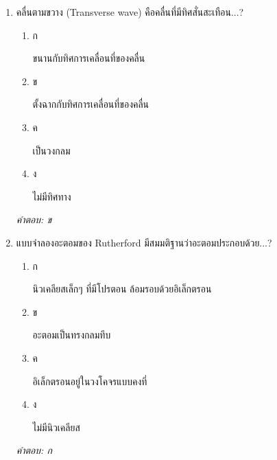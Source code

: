 \documentclass[12pt]{article}
\begin{document}
\begin{enumerate}[label=\arabic*., itemsep=0.5\baselineskip, topsep=0.5\baselineskip, leftmargin=*]
\item คลื่นตามขวาง (Transverse wave) คือคลื่นที่มีทิศสั่นสะเทือน...?
\begin{enumerate}[label=\alph*)., itemsep=0.3\baselineskip, topsep=0.3\baselineskip]
\item ก\ 
\begin{minipage}[t]{0.9\linewidth}
\raggedright ขนานกับทิศการเคลื่อนที่ของคลื่น
\end{minipage}
\item ข\ 
\begin{minipage}[t]{0.9\linewidth}
\raggedright ตั้งฉากกับทิศการเคลื่อนที่ของคลื่น
\end{minipage}
\item ค\ 
\begin{minipage}[t]{0.9\linewidth}
\raggedright เป็นวงกลม
\end{minipage}
\item ง\ 
\begin{minipage}[t]{0.9\linewidth}
\raggedright ไม่มีทิศทาง
\end{minipage}
\end{enumerate}
\vspace{-0.3\baselineskip}
\begin{small}
\textit{คำตอบ: ข}
\end{small}

\item แบบจำลองอะตอมของ Rutherford มีสมมติฐานว่าอะตอมประกอบด้วย...?
\begin{enumerate}[label=\alph*)., itemsep=0.3\baselineskip, topsep=0.3\baselineskip]
\item ก\ 
\begin{minipage}[t]{0.9\linewidth}
\raggedright นิวเคลียสเล็กๆ ที่มีโปรตอน ล้อมรอบด้วยอิเล็กตรอน
\end{minipage}
\item ข\ 
\begin{minipage}[t]{0.9\linewidth}
\raggedright อะตอมเป็นทรงกลมทึบ
\end{minipage}
\item ค\ 
\begin{minipage}[t]{0.9\linewidth}
\raggedright อิเล็กตรอนอยู่ในวงโคจรแบบคงที่
\end{minipage}
\item ง\ 
\begin{minipage}[t]{0.9\linewidth}
\raggedright ไม่มีนิวเคลียส
\end{minipage}
\end{enumerate}
\vspace{-0.3\baselineskip}
\begin{small}
\textit{คำตอบ: ก}
\end{small}


\end{enumerate}
\end{document}
